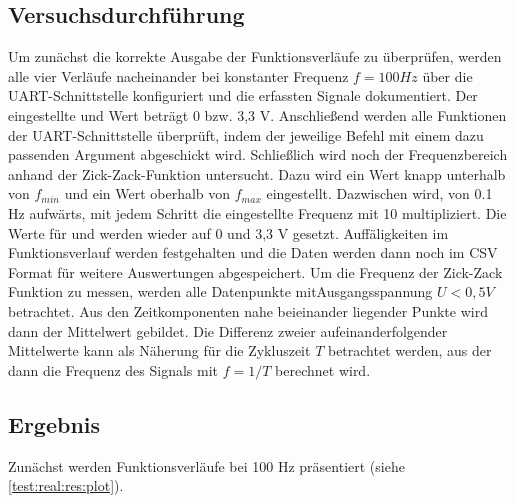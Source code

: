 \subsection{Versuchsdurchführung}
Um zunächst die korrekte Ausgabe der Funktionsverläufe zu überprüfen, werden alle vier Verläufe nacheinander bei konstanter Frequenz $f=100Hz$ über die UART-Schnittstelle konfiguriert und die erfassten Signale dokumentiert.
Der eingestellte  und  Wert beträgt 0 bzw. 3,3 V.
Anschließend werden alle Funktionen der UART-Schnittstelle überprüft, indem der jeweilige Befehl mit einem dazu passenden Argument abgeschickt wird.
Schließlich wird noch der Frequenzbereich anhand der Zick-Zack-Funktion untersucht.
Dazu wird ein Wert knapp unterhalb von $f_{min}$ und ein Wert oberhalb von $f_{max}$ eingestellt.
Dazwischen wird, von 0.1 Hz aufwärts, mit jedem Schritt die eingestellte Frequenz mit 10 multipliziert.
Die Werte für  und  werden wieder auf 0 und 3,3 V gesetzt.
Auffäligkeiten im Funktionsverlauf werden festgehalten und die Daten werden dann noch im CSV Format für weitere Auswertungen abgespeichert.
Um die Frequenz der Zick-Zack Funktion zu messen, werden alle Datenpunkte mitAusgangsspannung $U < 0,5 V$ betrachtet.
Aus den Zeitkomponenten nahe beieinander liegender Punkte wird dann der Mittelwert gebildet.
Die Differenz zweier aufeinanderfolgender Mittelwerte kann als Näherung für die Zykluszeit $T$ betrachtet werden, aus der dann die Frequenz des Signals mit $f = 1 / T$ berechnet wird.

\subsection{Ergebnis}

Zunächst werden Funktionsverläufe bei 100 Hz präsentiert (siehe \cref{test:real:res:plot}).

